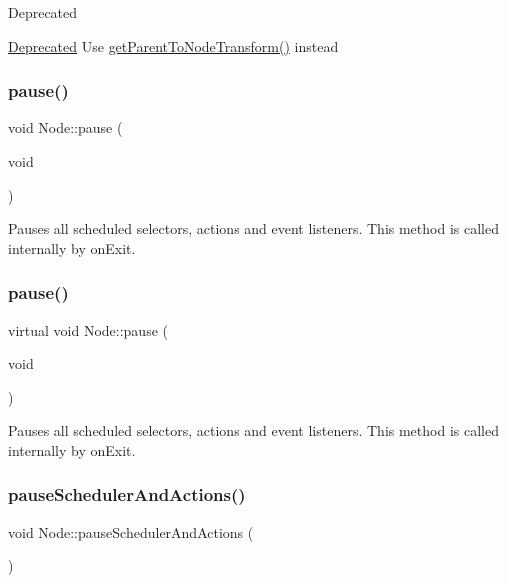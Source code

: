 \begin{DoxyRefDesc}{Deprecated}
\item[\hyperlink{deprecated__deprecated000264}{Deprecated}]Use \hyperlink{classNode_a12aae4242a85aa5acfc03c97a018b621}{get\+Parent\+To\+Node\+Transform()} instead \end{DoxyRefDesc}
\mbox{\label{classNode_a1076a4b9c753597c2c719c27d629d855}} 
\subsubsection{\texorpdfstring{pause()}{pause()}\hspace{0.1cm}{\footnotesize\ttfamily [1/2]}}
{\footnotesize\ttfamily void Node\+::pause (\begin{DoxyParamCaption}\item[{void}]{ }\end{DoxyParamCaption})\hspace{0.3cm}{\ttfamily [virtual]}}

Pauses all scheduled selectors, actions and event listeners. This method is called internally by on\+Exit. \mbox{\label{classNode_a2f262913d8d4f3f4ce386752b522208f}} 
\subsubsection{\texorpdfstring{pause()}{pause()}\hspace{0.1cm}{\footnotesize\ttfamily [2/2]}}
{\footnotesize\ttfamily virtual void Node\+::pause (\begin{DoxyParamCaption}\item[{void}]{ }\end{DoxyParamCaption})\hspace{0.3cm}{\ttfamily [virtual]}}

Pauses all scheduled selectors, actions and event listeners. This method is called internally by on\+Exit. \mbox{\label{classNode_abda89d75f7614e3b7c3d17788a61813b}} 
\subsubsection{\texorpdfstring{pause\+Scheduler\+And\+Actions()}{pauseSchedulerAndActions()}\hspace{0.1cm}{\footnotesize\ttfamily [1/2]}}
{\footnotesize\ttfamily void Node\+::pause\+Scheduler\+And\+Actions (\begin{DoxyParamCaption}{ }\end{DoxyParamCaption})}

